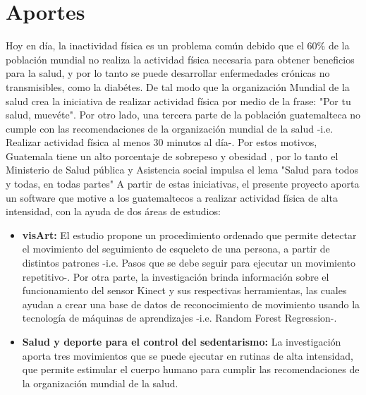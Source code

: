 \section{Aportes}
Hoy en d\'ia, la inactividad f\'isica es un problema com\'un debido que el 60\% de la poblaci\'on mundial no realiza la actividad f\'isica necesaria para obtener beneficios para la salud, y por lo tanto se puede desarrollar enfermedades cr\'onicas no transmisibles, como la diab\'etes. De tal modo que la organizaci\'on Mundial de la salud crea la iniciativa de realizar actividad f\'isica por medio de la frase: "Por tu salud, muev\'ete". \cite{orgSaludAF}
\medbreak
Por otro lado, una tercera parte de la poblaci\'on guatemalteca no cumple con las recomendaciones de la organizaci\'on mundial de la salud -i.e. Realizar actividad f\'isica al menos 30 minutos al d\'ia-. Por estos motivos, Guatemala tiene un alto porcentaje de sobrepeso y obesidad , por lo tanto el Ministerio de Salud p\'ublica y Asistencia social impulsa el lema "Salud para todos y todas, en todas partes" \cite{minSaludPub}
\medbreak
A partir de estas iniciativas, el presente proyecto aporta un software que motive a los guatemaltecos a realizar actividad f\'isica de alta intensidad, con la ayuda de dos \'areas de estudios:
\begin{itemize}
	\item \textbf{\gls{visArt}:} El estudio propone un procedimiento ordenado que permite detectar el movimiento del seguimiento de esqueleto de una persona, a partir de distintos patrones -i.e. Pasos que se debe seguir para ejecutar un movimiento repetitivo-. Por otra parte, la investigaci\'on brinda informaci\'on sobre el funcionamiento del sensor Kinect y sus respectivas herramientas, las cuales ayudan a crear una base de datos de reconocimiento de  movimiento usando la tecnolog\'ia de m\'aquinas de aprendizajes -i.e. Random Forest Regression-.
	\item \textbf{Salud y deporte para el control del sedentarismo:} La investigaci\'on aporta tres movimientos que se puede ejecutar en rutinas de alta intensidad, que permite estimular el cuerpo humano para cumplir las recomendaciones de la organizaci\'on mundial de la salud.
\end{itemize}